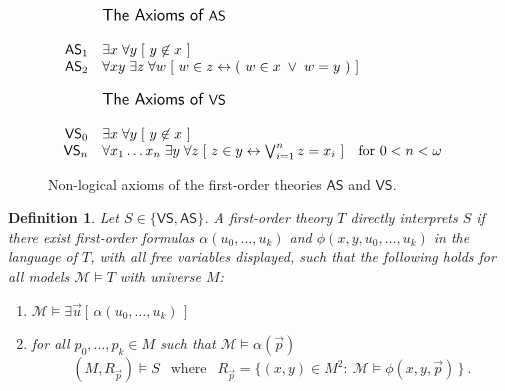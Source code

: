 \documentclass[10pt,a4paper, openany,  oldfontcommands]{memoir}
\newtheorem{definition} [theorem] {Definition}
\newtheorem{open problem} [theorem] {Open Problem}
\newtheorem{open question} [theorem] {Open Question}
\begin{document}
\begin{figure} 

\[
\begin{array}{r l  c  c r l  }
&{\large \textsf{The Axioms of } \mathsf{AS} }
&
\\
\\
\mathsf{AS}_1 
& 
 \exists x  \;  \forall y   \;   [    \   y \not\in x    \   ]   
\\
\mathsf{AS}_2 
& 
 \forall x y   \;  \exists z  \;    \forall w   \;   [    \   w \in z  \leftrightarrow   (    \    w \in x   \;  \vee   \;    w  =  y     \    )      \      ]   
 \\
 \\
 &{\large \textsf{The Axioms of } \mathsf{VS} }
&
\\
\\
\mathsf{VS}_0 
& 
  \exists x  \;  \forall y   \;   [       \   y \not\in x    \       ]  
\\
\mathsf{VS}_n 
& 
 \forall  x_1  \ldots  x_n    \;  \exists  y   \;   \forall z    \;   [     \   z \in y  \leftrightarrow  \bigvee_{ i = 1 }^{ n }   z = x_i       \        ] 
 \   \    \mbox{ for  }  0 < n <  \omega     
 \end{array}
\] 

\caption{
Non-logical axioms of the first-order theories   $ \mathsf{AS} $  and  $ \mathsf{VS} $.
}
\label{AxiomsOfAS}
\end{figure}



\begin{definition}
Let  $S  \in  \lbrace   \mathsf{VS} ,  \mathsf{AS} \rbrace   $. 
A first-order theory  $T$  \emph{directly interprets} $S$  if there exist  first-order formulas  
$  \alpha (u_0,   \ldots  ,  u_k  )  $  and  
$  \phi (x, y  ,  u_0,  \ldots , u_k ) $  in the language of  $T$, with all free variables displayed, 
such that  the following holds  for all models  $  \mathcal{M}  \models   T $  with universe $M$: 
\begin{enumerate}
\item    $  \mathcal{M} \models    \exists    \vec{u}    \left[  \,   \alpha (u_0,   \ldots  ,  u_k  )    \,    \right]   $



\item   for   all  $  p_0,  \ldots , p_k  \in  M  $  such that 
$  \mathcal{M}  \models  \alpha (  \vec{p}  )  $   
\[
 \left(  M,  R_{  \vec{p} }    \right)  \models  S 
 \     \   \mbox{  where  }    \     \  
  R_{  \vec{p} }   = 
   \big\{    ( x, y  )  \in  M^2  :   \     \mathcal{M} \models    \phi ( x,  y  ,  \vec{p} )    \,     \big\}      
 \         .
 \]
\end{enumerate}
\end{definition}
\end{document}
